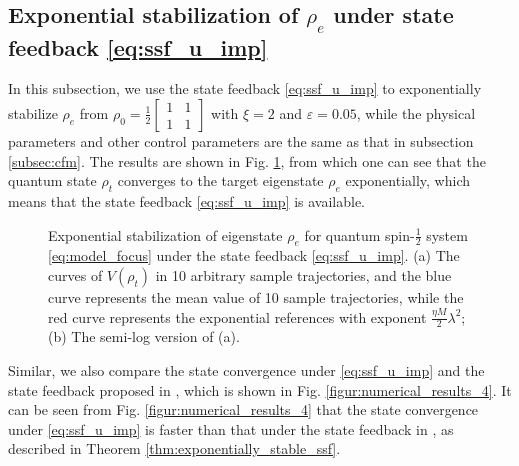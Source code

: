 \documentclass[]{elsarticle}
\begin{document}
\subsection{Exponential stabilization of $\rho_e$ under state feedback \eqref{eq:ssf_u_imp}}\label{subsec:sfm}
In this subsection, we use the state feedback \eqref{eq:ssf_u_imp} to exponentially stabilize $\rho_{e}$ from $\rho_0=\frac{1}{2}\left[\begin{array}{cc}
	1 & 1 \\
	1 & 1
\end{array}\right]$ with $\xi=2$ and $\varepsilon=0.05$, while the physical parameters and other control parameters are the same as that in subsection \ref{subsec:cfm}. The results are shown in Fig. \ref{figur:numerical_results_3}, from which one can see that the quantum state $\rho_{t}$ converges to the target eigenstate $\rho_{e}$ exponentially, which means that the state feedback \eqref{eq:ssf_u_imp} is available.
\begin{figure}[!htbp]
	\centering
	\hfil
	\caption{Exponential stabilization of eigenstate $\rho_{e}$ for quantum spin-$\frac{1}{2}$ system \eqref{eq:model_focus} under the state feedback \eqref{eq:ssf_u_imp}. (a) The curves of $V\left(\rho_{t}\right)$ in 10 arbitrary sample trajectories, and the blue curve represents the mean value of 10 sample trajectories, while the red curve represents the exponential references with exponent $\frac{{\eta M}}{2}\lambda^{2}$; (b)  The semi-log version of (a).}
	\label{figur:numerical_results_3}
\end{figure}
Similar, we also compare the state convergence under \eqref{eq:ssf_u_imp} and the state feedback proposed in \cite{WSJZJ2021b}, which is shown in Fig. \ref{figur:numerical_results_4}. It can be seen from Fig. \ref{figur:numerical_results_4} that the state convergence under \eqref{eq:ssf_u_imp} is faster than that under the state feedback in \cite{WSJZJ2021b}, as described in Theorem \ref{thm:exponentially_stable_ssf}. {}
\end{document}
